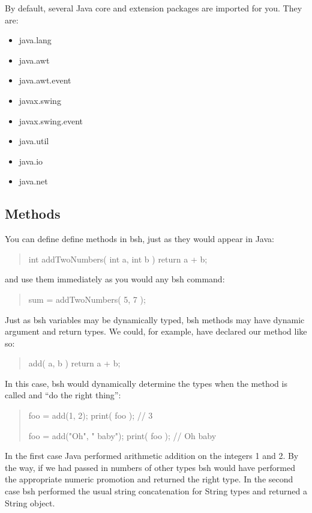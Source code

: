 \documentclass[twoside,11pt,nolof]{starlink}
\begin{document}
By default, several Java core and extension packages are imported for
you.  They are:
\begin{itemize}
\item java.lang
\item java.awt
\item java.awt.event
\item javax.swing
\item javax.swing.event
\item java.util
\item java.io
\item java.net
\end{itemize}

\subsection{Methods}

You can define define methods in bsh, just as they would appear in Java:
\begin{quote}
\begin{terminalv}
    int addTwoNumbers( int a, int b ) {
        return a + b;
    }
\end{terminalv}
\end{quote}
and use them immediately as you would any bsh command:
\begin{quote}
\begin{terminalv}
    sum = addTwoNumbers( 5, 7 );
\end{terminalv}
\end{quote}
Just as bsh variables may be dynamically typed, bsh methods may have
dynamic argument and return types.  We could, for example, have declared
our method like so:
\begin{quote}
\begin{terminalv}
    add( a, b ) {
        return a + b;
    }
\end{terminalv}
\end{quote}
In this case, bsh would dynamically determine the types when the method is
called and ``do the right thing'':
\begin{quote}
\begin{terminalv}
    foo = add(1, 2);
    print( foo ); // 3

    foo = add("Oh", " baby");
    print( foo ); // Oh baby
\end{terminalv}
\end{quote}
In the first case Java performed arithmetic addition on the integers 1 and 2.
By the way, if we had passed in numbers of other types bsh would have performed
the appropriate numeric promotion and returned the right type.  In the second
case bsh performed the usual string concatenation for String types and
returned a String object.
\end{document}
